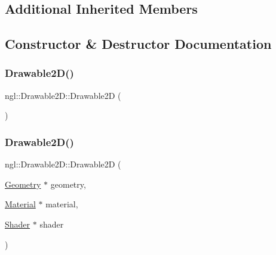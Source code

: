 \subsection*{Additional Inherited Members}


\subsection{Constructor \& Destructor Documentation}
\mbox{\label{classngl_1_1_drawable2_d_a584ea95db37c4c66c85c1b18b53a973d}} 
\subsubsection{\texorpdfstring{Drawable2\+D()}{Drawable2D()}\hspace{0.1cm}{\footnotesize\ttfamily [1/2]}}
{\footnotesize\ttfamily ngl\+::\+Drawable2\+D\+::\+Drawable2D (\begin{DoxyParamCaption}{ }\end{DoxyParamCaption})\hspace{0.3cm}{\ttfamily [explicit]}}

\mbox{\label{classngl_1_1_drawable2_d_a27d0cff4f875481d1accd04946ac1159}} 
\subsubsection{\texorpdfstring{Drawable2\+D()}{Drawable2D()}\hspace{0.1cm}{\footnotesize\ttfamily [2/2]}}
{\footnotesize\ttfamily ngl\+::\+Drawable2\+D\+::\+Drawable2D (\begin{DoxyParamCaption}\item[{\mbox{\hyperlink{classngl_1_1_geometry}{Geometry}} $\ast$}]{geometry,  }\item[{\mbox{\hyperlink{classngl_1_1_material}{Material}} $\ast$}]{material,  }\item[{\mbox{\hyperlink{classngl_1_1_shader}{Shader}} $\ast$}]{shader }\end{DoxyParamCaption})\hspace{0.3cm}{\ttfamily [explicit]}}


